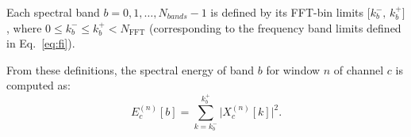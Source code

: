 \documentclass[11pt]{article}
\begin{document}
Each spectral band $b = 0, 1, \dots, N_{bands}-1$ is defined by its FFT-bin limits $\big[k_b^{-},\, k_b^{+}\big]$, where $0 \le k_b^{-} \le k_b^{+} < N_{\mathrm{FFT}}$ (corresponding to the frequency band limits defined in Eq.~\eqref{eq:fi}).

From these definitions, the spectral energy of band $b$ for window $n$ of channel $c$ is computed as:
\begin{equation}
E_c^{(n)}[b] = \sum_{k = k_b^{-}}^{k_b^{+}} \big| X_c^{(n)}[k] \big|^2.
\end{equation}




\end{document}

